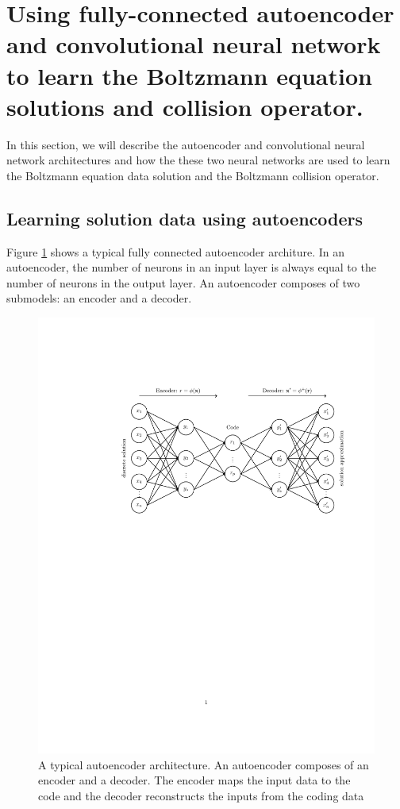 \documentclass{article}
\begin{document}
\section{Using fully-connected autoencoder and convolutional neural network to learn the Boltzmann equation solutions and collision operator.}
In this section, we will describe the autoencoder and convolutional neural network architectures and how the these two neural networks are used to learn the Boltzmann equation data solution and the Boltzmann collision operator. 

\subsection{Learning solution data using autoencoders} \label{ae}
Figure \ref{fig:ae} shows a typical fully connected autoencoder architure. In an autoencoder, the number of neurons in an input layer is always equal to the number of neurons in the output layer. An autoencoder composes of two submodels: an encoder and a decoder.
\begin{figure}
\centering
\includegraphics[width=1.0\textwidth]{Autoencoder.pdf}
\caption{A typical autoencoder architecture. An autoencoder composes of an encoder and a decoder. The encoder maps the input data to the code and the decoder reconstructs the inputs from the coding data}
\label{fig:ae}
\end{figure} 
\end{document}

